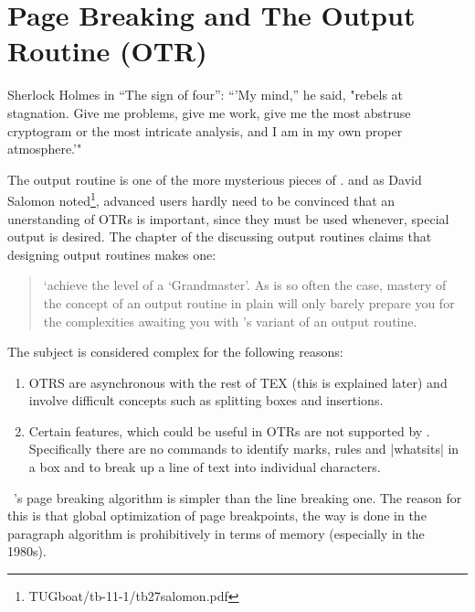 \chapter{Page Breaking and The Output Routine (OTR)}


\label{ch:OTR}

\epigraph{Sherlock Holmes in ``The sign of four'': ``'My mind,'' he said, "rebels at stagnation. Give me problems, give me work, give me the most abstruse cryptogram or the most intricate analysis, and I am in my own proper atmosphere.'" }{}


The output routine is one of the more mysterious pieces
of \tex.
and as  David Salomon noted\footnote{TUGboat/tb-11-1/tb27salomon.pdf}, advanced users hardly need to be convinced that an unerstanding of OTRs is important, since they must be used whenever, special output is desired.
 The chapter of the \texbook discussing output
routines claims that designing output routines makes one:

\begin{quotation}
`achieve the level of a `\tex Grandmaster'.
As is so often the case, mastery of the concept of an
output routine in plain \tex will only barely prepare you
for the complexities awaiting you with \latexe's variant of
an output routine.
\end{quotation}


The subject is considered complex for the following reasons:

\begin{enumerate}
\item OTRS are asynchronous with the
rest of TEX (this is explained later) and involve difficult concepts such as splitting boxes and insertions.
\item Certain features, which could be useful in OTRs are not supported by \tex. Specifically there are no commands to identify marks, rules and |whatsits| in a box and to break up a line of text into individual characters.
\end{enumerate}

\tex\ 's page breaking algorithm is simpler than the line breaking one. The reason for this is that global optimization
of page breakpoints, the way is done in the paragraph algorithm is prohibitively in terms of memory (especially in the 1980s).


